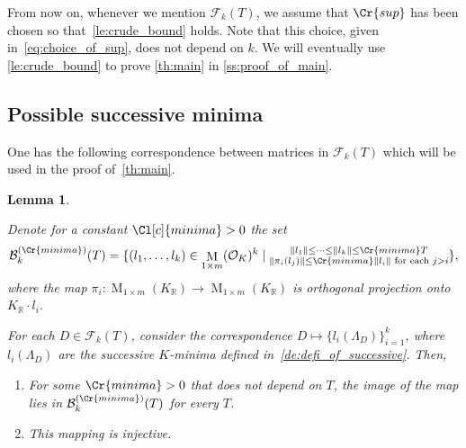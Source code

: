 \documentclass{amsart}
\newtheorem{lemma}[theorem]{Lemma}
\theoremstyle{definition}
\theoremstyle{remark}
\newcommand{\OK}{\mathcal{O}_K}
\newcommand{\KR}{K_\mathbb{R}}
\DeclareMathOperator{\M}{M}
\begin{document}
From now on, whenever we mention $\mathcal{F}_{k}(T)$, 
we assume that $\Cr{sup}$ has been chosen so that~\cref{le:crude_bound} holds. 
Note that this choice, given in~\cref{eq:choice_of_sup}, does not depend on $k$.
We will eventually use \cref{le:crude_bound} to prove \cref{th:main} in \cref{ss:proof_of_main}.

\subsection{Possible successive minima}

One has the following correspondence between matrices in $\mathcal{F}_{k}(T)$ which will be used in the proof of~\cref{th:main}.
\begin{lemma}
    \label{le:injective_minima}

    Denote for a constant $\Cl[c]{minima}>0$ the set
    \begin{align}
        \mathcal{B}_{k}^{(\Cr{minima})} (T)= \{(l_{1},\dots,l_{k}) \in \M_{1 \times m}(\OK)^{k} \mid  \substack{\|l_{1}\| \leq \dots \leq \|l_{k}\| \leq \Cr{minima} T \\  \|\pi_{i}(l_{j})\| \leq \Cr{minima} \|l_{i}\|  \text{ for each }j>i }\},
    \end{align}
    where the map $\pi_{i}:\M_{1 \times m}(\KR) \rightarrow  \M_{1 \times m}(\KR)$ is orthogonal projection onto $\KR \cdot l_{i}$.

    For each $D \in \mathcal{F}_{k}(T)$, consider the correspondence $D \mapsto  \{l_{i}(\Lambda_{D})\}_{i=1}^{k}$, where $l_{i}(\Lambda_{D})$ are the successive $K$-minima defined in~\cref{de:defi_of_successive}. Then, 
    \begin{enumerate}
        \item 
            For some $\Cr{minima} > 0$ that does not depend on $T$, the image of the map lies in $\mathcal{B}_{k}^{(\Cr{minima})}(T)$ for every $T$.
        \item This mapping is injective.
    \end{enumerate}
\end{lemma}
\end{document}
